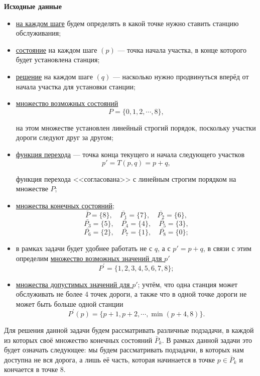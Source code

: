 \bigskip

\textbf{Исходные данные}
\begin{itemize}[nosep]	
	\item \underline{на каждом шаге} будем определять в какой точке нужно ставить станцию обслуживания;
	
	\item \underline{состояние} на каждом шаге $(p)$ --- точка начала участка, в конце которого будет установлена станция;
	
	\item \underline{решение} на каждом шаге $(q)$ --- насколько нужно продвинуться вперёд от начала участка для установки станции;
	
	\item \underline{множество возможных состояний}
	\[P= \big\{0, 1, 2, \cdots, 8 \big\},\]
	
	на этом множестве установлен линейный строгий порядок, поскольку участки дороги следуют друг за другом;
	
	\item \underline{функция перехода} --- точка конца текущего и начала следующего участков
	\[p' = T(p, q) = p + q,\]
	
	функция перехода <<согласована>> с линейным строгим порядком на множестве $P$;
	
	\item \underline{множества конечных состояний};
	\[
	\bar{P} = \{8\}, \quad \bar{P_1} = \{7\}, \quad \bar{P_2} = \{6\},
	\]
	\[
	\bar{P_3} = \{5\}, \quad \bar{P_4} = \{4\}, \quad \bar{P_5} = \{3\},
	\]
	\[
	\bar{P_6} = \{2\}, \quad \bar{P_7} = \{1\}, \quad \bar{P_8} = \{0\};
	\]
	
	\item в рамках задачи будет удобнее работать не с $q$, а с $p'= p + q$, в связи с этим определим \underline{множество возможных значений для $p'$}
	\[P^{'} = \{1, 2, 3, 4, 5, 6, 7, 8\};\]
	
	\item \underline{множества допустимых значений для $p'$}; учтём, что одна станция может обслуживать не более 4 точек дороги, а также что в одной точке дороги не может быть больше одной станции
	\[P^{'}(p) = \{p+1, p+2, \cdots, \min(p + 4, 8)\}.\]
\end{itemize}

Для решения данной задачи будем рассматривать различные подзадачи, в каждой из которых своё множество конечных состояний $\bar{P}_k$. В рамках данной задачи это будет означать следующее: мы будем рассматривать подзадачи, в которых нам доступна не вся дорога, а лишь её часть, которая начинается в точке $p \in \bar{P}_k$ и кончается в точке 8.

